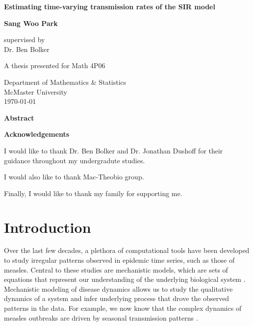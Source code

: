 \documentclass{article}
\begin{document}
\begin{titlepage}
   \begin{center}
       \vspace*{1cm}
 
       \textbf{Estimating time-varying transmission rates of the SIR model}
 
       \vspace{1.5cm}
 
       \textbf{Sang Woo Park}
 
       \vfill
 
       supervised by \\ \vspace{0.2cm}
       Dr. Ben Bolker
       
 	   \vspace{1.5cm}
 
       A thesis presented for Math 4P06\\
 
       \vspace{0.8cm}
 
       Department of Mathematics \& Statistics\\
       McMaster University\\
       \today
 
   \end{center}
\end{titlepage}
\pagebreak

\begin{center}
\textbf{Abstract}
\end{center}

\pagebreak

\begin{center}
\textbf{Acknowledgements}
\end{center}

I would like to thank Dr. Ben Bolker and Dr. Jonathan Dushoff for their guidance throughout my undergradute studies.

I would also like to thank Mac-Theobio group.

Finally, I would like to thank my family for supporting me.

\pagebreak

\tableofcontents

\pagebreak

\section{Introduction}

Over the last few decades, a plethora of computational tools have been developed to study irregular patterns observed in epidemic time series, such as those of measles.
Central to these studies are mechanistic models, which are sets of equations that represent our understanding of the underlying biological system \citep{breto2009time}.
Mechanistic modeling of disease dynamics allows us to study the qualitative dynamics of a system and infer underlying process that drove the observed patterns in the data.
For example, we now know that the complex dynamics of measles outbreaks are driven by seasonal transmission patterns \citep{earn2000simple, dalziel2016persistent}.
\end{document}
